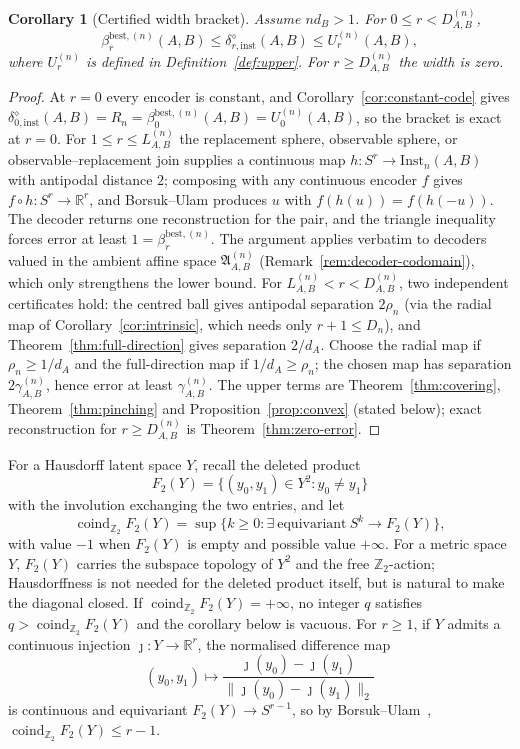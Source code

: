 \documentclass[11pt,a4paper]{article}
\newtheorem{corollary}[theorem]{Corollary}
\newcommand{\Inst}{\mathrm{Inst}}
\newcommand{\coind}{\operatorname{coind}_{\mathbb Z_2}}
\begin{document}
\begin{corollary}[Certified width bracket]
\label{cor:bracket}
Assume $nd_B>1$. For $0\le r<D_{A,B}^{(n)}$,
\[
\beta_r^{\mathrm{best},(n)}(A,B)
\le\delta_{r,\mathrm{inst}}^{\diamond}(A,B)
\le U_r^{(n)}(A,B),
\]
where $U_r^{(n)}$ is defined in Definition~\ref{def:upper}. For $r\ge D_{A,B}^{(n)}$ the width is zero.
\end{corollary}

\begin{proof}
At $r=0$ every encoder is constant, and Corollary~\ref{cor:constant-code} gives $\delta_{0,\mathrm{inst}}^{\diamond}(A,B)=R_n=\beta_0^{\mathrm{best},(n)}(A,B)=U_0^{(n)}(A,B)$, so the bracket is exact at $r=0$. For $1\le r\le L_{A,B}^{(n)}$ the replacement sphere, observable sphere, or observable--replacement join supplies a continuous map $h:S^r\to\Inst_n(A,B)$ with antipodal distance $2$; composing with any continuous encoder $f$ gives $f\circ h:S^r\to\mathbb R^r$, and Borsuk--Ulam produces $u$ with $f(h(u))=f(h(-u))$. The decoder returns one reconstruction for the pair, and the triangle inequality forces error at least $1=\beta_r^{\mathrm{best},(n)}$. The argument applies verbatim to decoders valued in the ambient affine space $\mathfrak A_{A,B}^{(n)}$ (Remark~\ref{rem:decoder-codomain}), which only strengthens the lower bound. For $L_{A,B}^{(n)}<r<D_{A,B}^{(n)}$, two independent certificates hold: the centred ball gives antipodal separation $2\rho_n$ (via the radial map of Corollary~\ref{cor:intrinsic}, which needs only $r+1\le D_n$), and Theorem~\ref{thm:full-direction} gives separation $2/d_A$. Choose the radial map if $\rho_n\ge1/d_A$ and the full-direction map if $1/d_A\ge\rho_n$; the chosen map has separation $2\gamma_{A,B}^{(n)}$, hence error at least $\gamma_{A,B}^{(n)}$. The upper terms are Theorem~\ref{thm:covering}, Theorem~\ref{thm:pinching} and Proposition~\ref{prop:convex} (stated below); exact reconstruction for $r\ge D_{A,B}^{(n)}$ is Theorem~\ref{thm:zero-error}.
\end{proof}

For a Hausdorff latent space $Y$, recall the deleted product
\[
F_2(Y)=\{(y_0,y_1)\in Y^2:y_0\neq y_1\}
\]
with the involution exchanging the two entries, and let
\[
\coind F_2(Y)
=\sup\big\{k\ge0:\exists\ \text{equivariant}\ S^k\to F_2(Y)\big\},
\]
with value $-1$ when $F_2(Y)$ is empty and possible value $+\infty$. For a metric space $Y$, $F_2(Y)$ carries the subspace topology of $Y^2$ and the free $\mathbb Z_2$-action; Hausdorffness is not needed for the deleted product itself, but is natural to make the diagonal closed. If $\coind F_2(Y)=+\infty$, no integer $q$ satisfies $q>\coind F_2(Y)$ and the corollary below is vacuous. For $r\ge1$, if $Y$ admits a continuous injection $\jmath:Y\to\mathbb R^r$, the normalised difference map
\[
(y_0,y_1)\longmapsto\frac{\jmath(y_0)-\jmath(y_1)}{\|\jmath(y_0)-\jmath(y_1)\|_2}
\]
is continuous and equivariant $F_2(Y)\to S^{r-1}$, so by Borsuk--Ulam~\cite{Matousek2003}, $\coind F_2(Y)\le r-1$.
\end{document}
